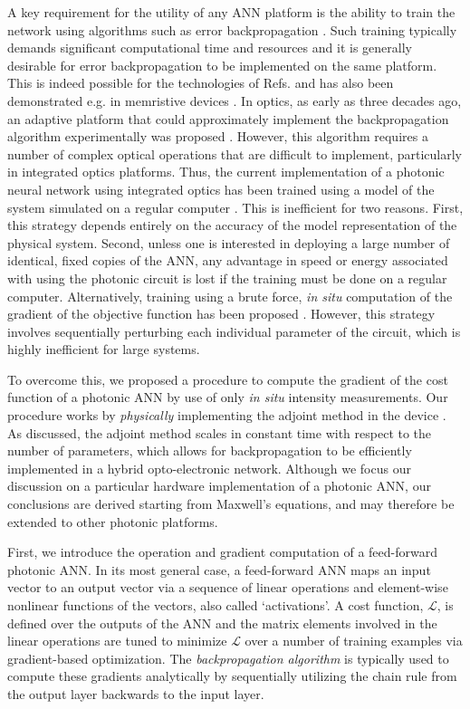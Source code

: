 A key requirement for the utility of any ANN platform is the ability to train the network using algorithms such as error backpropagation \cite{Rumelhart1986}. Such training typically demands significant computational time and resources and it is generally desirable for error backpropagation to be implemented on the same platform. This is indeed possible for the technologies of Refs. \cite{Merolla2014, Graves2016, Hermans2015} and has also been demonstrated e.g. in memristive devices \cite{alibart2013pattern, Prezioso2015}. In optics, as early as three decades ago, an adaptive platform that could approximately implement the backpropagation algorithm experimentally was proposed \cite{wagner1987multilayer,psaltis1988adaptive}. However, this algorithm requires a number of complex optical operations that are difficult to implement, particularly in integrated optics platforms. Thus, the current implementation of a photonic neural network using integrated optics has been trained using a model of the system simulated on a regular computer \cite{shen2017deep}. This is inefficient for two reasons. First, this strategy depends entirely on the accuracy of the model representation of the physical system. Second, unless one is interested in deploying a large number of identical, fixed copies of the ANN, any advantage in speed or energy associated with using the photonic circuit is lost if the training must be done on a regular computer.  Alternatively, training using a brute force, \textit{in situ} computation of the gradient of the objective function has been proposed \cite{shen2017deep}. However, this strategy involves sequentially perturbing each individual parameter of the circuit, which is highly inefficient for large systems.

To overcome this, we proposed \cite{hughes2018training} a procedure to compute the gradient of the cost function of a photonic ANN by use of only \textit{in situ} intensity measurements.    Our procedure works by \textit{physically} implementing the adjoint method in the device \cite{Georgieva2002, Veronis2004, hughes_method_2017}.  As discussed, the adjoint method scales in constant time with respect to the number of parameters, which allows for backpropagation to be efficiently implemented in a hybrid opto-electronic network.  Although we focus our discussion on a particular hardware implementation of a photonic ANN, our conclusions are derived starting from Maxwell’s equations, and may therefore be extended to other photonic platforms.

First, we introduce the operation and gradient computation of a feed-forward photonic ANN.  In its most general case, a feed-forward ANN maps an input vector to an output vector via a sequence of linear operations and element-wise nonlinear functions of the vectors, also called `activations'.  A cost function, $\mathcal{L}$, is defined over the outputs of the ANN and the matrix elements involved in the linear operations are tuned to minimize $\mathcal{L}$ over a number of training examples via gradient-based optimization.  The \textit{backpropagation algorithm} is typically used to compute these gradients analytically by sequentially utilizing the chain rule from the output layer backwards to the input layer.

